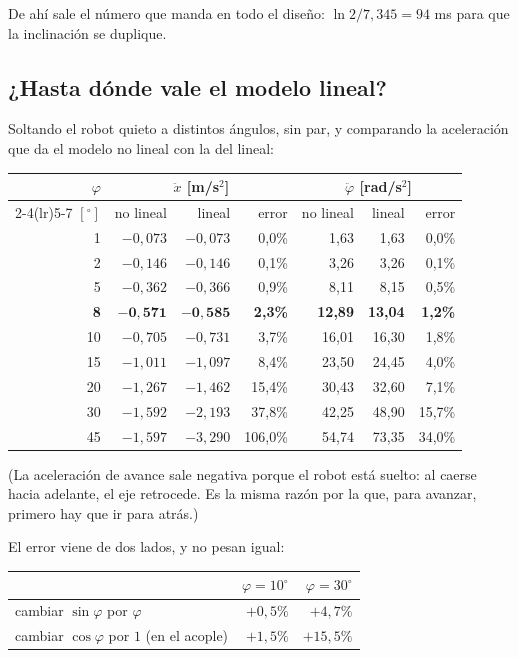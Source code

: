 \documentclass[11pt,a4paper]{report}
\begin{document}
De ahí sale el número que manda en todo el diseño: $\ln 2 / 7{,}345 = 94$ ms para que la
inclinación se duplique.

\subsection{¿Hasta dónde vale el modelo lineal?}

Soltando el robot quieto a distintos ángulos, sin par, y comparando la aceleración que da el
modelo no lineal con la del lineal:

\begin{center}
\small
\begin{tabular}{@{}rrrrrrr@{}}
\toprule
$\varphi$ & \multicolumn{3}{c}{$\ddot x$ [m/s$^2$]} & \multicolumn{3}{c}{$\ddot\varphi$ [rad/s$^2$]} \\
\cmidrule(lr){2-4}\cmidrule(lr){5-7}
$[^\circ]$ & no lineal & lineal & error & no lineal & lineal & error \\
\midrule
1  & $-0{,}073$ & $-0{,}073$ & 0{,}0\% & 1{,}63  & 1{,}63  & 0{,}0\% \\
2  & $-0{,}146$ & $-0{,}146$ & 0{,}1\% & 3{,}26  & 3{,}26  & 0{,}1\% \\
5  & $-0{,}362$ & $-0{,}366$ & 0{,}9\% & 8{,}11  & 8{,}15  & 0{,}5\% \\
\textbf{8}  & $\mathbf{-0{,}571}$ & $\mathbf{-0{,}585}$ & \textbf{2{,}3\%} & \textbf{12{,}89} & \textbf{13{,}04} & \textbf{1{,}2\%} \\
10 & $-0{,}705$ & $-0{,}731$ & 3{,}7\% & 16{,}01 & 16{,}30 & 1{,}8\% \\
15 & $-1{,}011$ & $-1{,}097$ & 8{,}4\% & 23{,}50 & 24{,}45 & 4{,}0\% \\
20 & $-1{,}267$ & $-1{,}462$ & 15{,}4\% & 30{,}43 & 32{,}60 & 7{,}1\% \\
30 & $-1{,}592$ & $-2{,}193$ & 37{,}8\% & 42{,}25 & 48{,}90 & 15{,}7\% \\
45 & $-1{,}597$ & $-3{,}290$ & 106{,}0\% & 54{,}74 & 73{,}35 & 34{,}0\% \\
\bottomrule
\end{tabular}
\end{center}

(La aceleración de avance sale negativa porque el robot está suelto: al caerse hacia adelante,
el eje retrocede. Es la misma razón por la que, para avanzar, primero hay que ir para atrás.)

El error viene de dos lados, y no pesan igual:

\begin{center}
\small
\begin{tabular}{@{}lrr@{}}
\toprule
& $\varphi = 10^\circ$ & $\varphi = 30^\circ$ \\
\midrule
cambiar $\sin\varphi$ por $\varphi$ & $+0{,}5\%$ & $+4{,}7\%$ \\
cambiar $\cos\varphi$ por $1$ (en el acople) & $+1{,}5\%$ & $+15{,}5\%$ \\
\bottomrule
\end{tabular}
\end{center}
\end{document}
